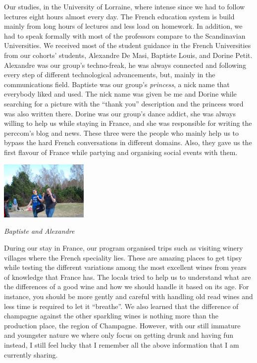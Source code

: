 \documentclass[10pt,a4paper]{article} %
\begin{document}
\begin{multicols}{3}
Our studies, in the University of Lorraine, where intense since we had to 
follow lectures eight hours almost every day. 
The French education system is build mainly from long hours of lectures and less 
load on homework. 
In addition, we had to speak formally with most of the professors compare to the 
Scandinavian Universities. 
We received most of the student guidance in the French Universities from our 
cohorts' students, Alexandre De Masi, Baptiste Louis, and Dorine Petit. 
Alexandre was our group's techno-freak, he was always connected and following 
every step of different technological advancements, but, mainly in the communications 
field. 
Baptiste was our group's \textit{princess}, a nick name that everybody liked and used. 
The nick name was given be me and Dorine while searching for a picture with the ``thank 
you'' description and the princess word was also written there. 
Dorine was our group's dance addict, she was always willing to help us while 
staying in France, and she was responsible for writing the {\sc perccom}'s blog and 
news.
These three were the people who mainly help us to bypass the hard French conversations 
in different domains. 
Also, they gave us the first flavour of France while partying and organising 
social events with them. 


\begin{center}
	\includegraphics[width=0.32\textwidth]{media/baptiste_alex.jpg}
	\par\textit{Baptiste and Alexandre}
\end{center} 


During our stay in France, our program organised trips such as visiting winery 
villages where the French speciality lies. 
These are amazing places to get tipsy while testing the different variations 
among the most excellent wines from years of knowledge that France has. 
The locals tried to help us to understand what are the differences of a good wine 
and how we should handle it based on its age. 
For instance, you should be more gently and careful with handling old read wines
and less time is required to let it ``breathe''. 
We also learned that the difference of champagne against the other sparkling wines 
is nothing more than the production place, the region of Champagne. 
However, with our still immature and youngster nature we where only focus on getting 
drunk and having fun instead, I still feel lucky that I remember all the above 
information that I am currently sharing. 



\end{multicols}
\end{document}
